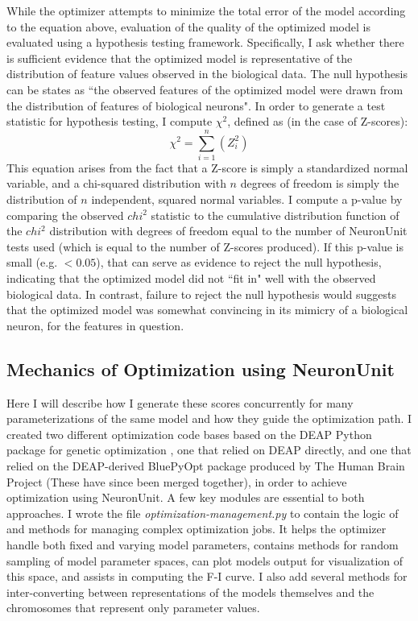 While the optimizer attempts to minimize the total error of the model according to the equation above, evaluation of the quality of the optimized model is evaluated using a hypothesis testing framework.
Specifically, I ask whether there is sufficient evidence that the optimized model is representative of the distribution of feature values observed in the biological data.
The null hypothesis can be states as ``the observed features of the optimized model were drawn from the distribution of features of biological neurons".
In order to generate a test statistic for hypothesis testing, I compute $\chi^{2}$, defined as (in the case of Z-scores):
\begin{equation}
\chi^{2}=\sum\limits_{i=1}^{n}(Z_{i}^{2})
\end{equation}
This equation arises from the fact that a Z-score is simply a standardized normal variable, and a chi-squared distribution with $n$ degrees of freedom is simply the distribution of $n$ independent, squared normal variables.
I compute a p-value by comparing the observed $chi^2$ statistic to the cumulative distribution function of the $chi^2$ distribution with degrees of freedom equal to the number of NeuronUnit tests used (which is equal to the number of Z-scores produced).
If this p-value is small (e.g. $<0.05$), that can serve as evidence to reject the null hypothesis, indicating that the optimized model did not ``fit in" well with the observed biological data.
In contrast, failure to reject the null hypothesis would suggests that the optimized model was somewhat convincing in its mimicry of a biological neuron, for the features in question.

\subsection{Mechanics of Optimization using NeuronUnit}
Here I will describe how I generate these scores concurrently for many parameterizations of the same model and how they guide the optimization path.
I created two different optimization code bases based on the DEAP Python package for genetic optimization \citep{DEAP_JMLR2012}, one that relied on DEAP directly, and one that relied on the DEAP-derived BluePyOpt package produced by The Human Brain Project \citep{bluepyopt} (These have since been merged together), in order to achieve optimization using NeuronUnit.
A few key modules are essential to both approaches.
I wrote the file \emph{optimization-management.py} to contain the logic of and methods for managing complex optimization jobs.
It helps the optimizer handle both fixed and varying  model parameters, contains methods for random sampling of model parameter spaces, can plot models output for visualization of this space, and assists in computing the F-I curve.
I also add several methods for inter-converting between representations of the models themselves and the chromosomes that represent only parameter values.

